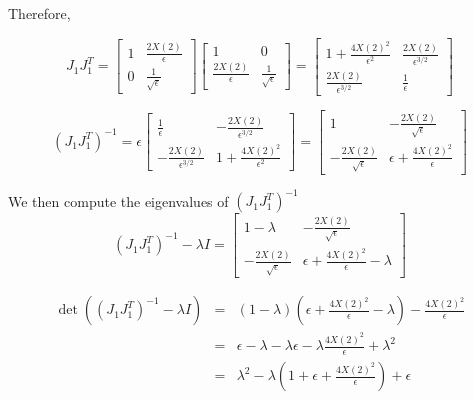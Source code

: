 \documentclass[12pt]{article}
\begin{document}
Therefore,

\begin{equation}
J_1 J_1^T =
\begin{bmatrix} 1 & \frac{2X(2)}{\epsilon} \\ 0 & \frac{1}{\sqrt{\epsilon}} \end{bmatrix} 
\begin{bmatrix} 1 & 0 \\ \frac{2X(2)}{\epsilon} & \frac{1}{\sqrt{\epsilon}} \end{bmatrix}
= \begin{bmatrix}
1+\frac{4 X(2)^2}{\epsilon^2} & \frac{2X(2)}{\epsilon^{3/2}} \\
\frac{2X(2)}{\epsilon^{3/2}} & \frac{1}{\epsilon}
\end{bmatrix}
\end{equation}

\begin{equation}
\left( J_1 J_1^T \right)^{-1} = 
\epsilon \begin{bmatrix}
\frac{1}{\epsilon} & -\frac{2X(2)}{\epsilon^{3/2}} \\
-\frac{2X(2)}{\epsilon^{3/2}} & 1+\frac{4  X(2)^2}{\epsilon^2}
\end{bmatrix}
= \begin{bmatrix}
1 & -\frac{2X(2)}{\sqrt{\epsilon}} \\
-\frac{2X(2)}{\sqrt{\epsilon}} & \epsilon+\frac{4 X(2)^2}{\epsilon}
\end{bmatrix}
\end{equation}

We then compute the eigenvalues of $(J_1 J_1^T)^{-1}$
\begin{equation}
\left( J_1 J_1^T \right)^{-1} - \lambda I =
\begin{bmatrix}
1-\lambda & -\frac{2X(2)}{\sqrt{\epsilon}} \\
-\frac{2X(2)}{\sqrt{\epsilon}} & \epsilon+\frac{4 X(2)^2}{\epsilon}-\lambda
\end{bmatrix}
\end{equation}

\begin{eqnarray}
\det \left( \left( J_1 J_1^T \right)^{-1} - \lambda I \right) &=& 
\left(1-\lambda \right) \left( \epsilon+\frac{4 X(2)^2}{\epsilon}-\lambda \right) - \frac{4 X(2)^2 }{\epsilon} \\
&=& \epsilon - \lambda  - \lambda \epsilon - \lambda \frac{4 X(2)^2}{\epsilon} + \lambda^2 \\
&=& \lambda^2 - \lambda \left( 1 + \epsilon + \frac{4 X(2)^2}{\epsilon} \right) + \epsilon
\end{eqnarray}
\end{document}
